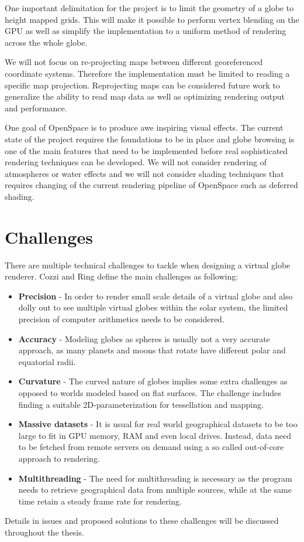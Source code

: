 One important delimitation for the project is to limit the geometry of a globe to height mapped grids. This will make it possible to perform vertex blending on the GPU as well as simplify the implementation to a uniform method of rendering across the whole globe.

We will not focus on re-projecting maps between different georeferenced coordinate systems. Therefore the implementation must be limited to reading a specific map projection. Reprojecting maps can be considered future work to generalize the ability to read map data as well as optimizing rendering output and performance.

One goal of OpenSpace is to produce awe inspiring visual effects. The current state of the project requires the foundations to be in place and globe browsing is one of the main features that need to be implemented before real sophisticated rendering techniques can be developed. We will not consider rendering of atmospheres or water effects and we will not consider shading techniques that requires changing of the current rendering pipeline of OpenSpace such as deferred shading.

\section{Challenges}

There are multiple technical challenges to tackle when designing a virtual globe renderer. Cozzi and Ring \cite{cozzi11} define the main challenges as following:

\begin{itemize}

\item \textbf{Precision} - In order to render small scale details of a virtual globe and also dolly out to see multiple virtual globes within the solar system, the limited precision of computer arithmetics needs to be considered.
\item \textbf{Accuracy} - Modeling globes as spheres is usually not a very accurate approach, as many planets and moons that rotate have different polar and equatorial radii.
\item \textbf{Curvature} - The curved nature of globes implies some extra challenges as opposed to worlds modeled based on flat surfaces. The challenge includes finding a suitable 2D-parameterization for tessellation and mapping.
\item \textbf{Massive datasets} - It is usual for real world geographical datasets to be too large to fit in GPU memory, RAM and even local drives. Instead, data need to be fetched from remote servers on demand using a so called out-of-core approach to rendering.
\item \textbf{Multithreading} - The need for multithreading is necessary as the program needs to retrieve geographical data from multiple sources, while at the same time retain a steady frame rate for rendering.

\end{itemize}

Details in issues and proposed solutions to these challenges will be discussed throughout the thesis.
